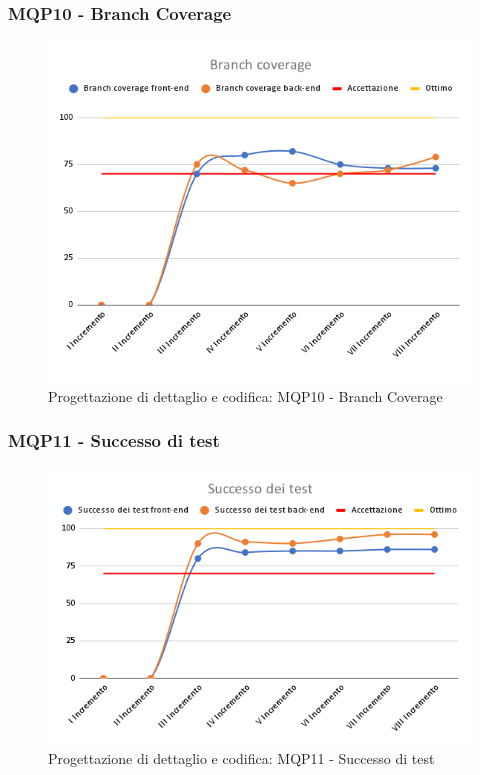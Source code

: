 \subsubsection{MQP10 - Branch Coverage}
\begin{figure}[H]
    \centering
    \includegraphics[scale=0.50]{Sezioni/images/pb_prodotto/Branch_coverage.png}
    \caption{Progettazione di dettaglio e codifica: MQP10 - Branch Coverage}
\end{figure}
\subsubsection{MQP11 - Successo di test}
\begin{figure}[H]
    \centering
    \includegraphics[scale=0.50]{Sezioni/images/pb_prodotto/Successo_dei_test.png}
    \caption{Progettazione di dettaglio e codifica: MQP11 - Successo di test}
\end{figure}
